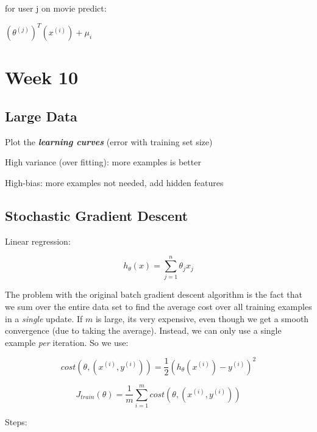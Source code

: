 \documentclass{article}
\begin{document}
 for user j on movie predict:
 
 $(\theta^{(j)})^T (x^{(i)}) + \mu_i$
 
 
 
 
 
 
 \section{Week 10}
 
 
 
 \subsection{Large Data}
 
 
Plot the \textbf{\textit{learning curves}} (error with training set size)

High variance (over fitting): more examples is better

High-bias: more examples not needed, add hidden features 





\subsection{Stochastic Gradient Descent}

Linear regression:

\begin{equation}
    h_{\theta} (x)  = \sum_{j=1}^n \theta_j x_j
\end{equation}

The problem with the original batch gradient descent algorithm is the fact that we sum over the entire data set to find the average cost over all training examples in a \textit{single} update. If $m$ is large, its very expensive, even though we get a smooth convergence (due to taking the average). Instead, we can only use a single example \textit{per} iteration. So we use:


\begin{equation}
    cost(\theta, (x^{(i)}, y^{(i)})) = \frac{1}{2} \left(h_{\theta} (x^{(i)}) - y^{(i)}\right)^2
\end{equation}

\begin{equation}
    J_{train} (\theta) = \frac{1}{m} \sum_{i=1}^m cost(\theta, (x^{(i)}, y^{(i)}))
\end{equation}
 
Steps:
\end{document}

